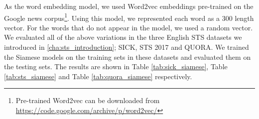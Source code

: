 As the word embedding model, we used Word2vec embeddings \autocite{DBLP:journals/corr/abs-1301-3781} pre-trained on the Google news corpus\footnote{Pre-trained Word2vec can be downloaded from \url{https://code.google.com/archive/p/word2vec/}}. Using this model, we represented each word as a 300 length vector. For the words that do not appear in the model, we used a random vector. 
We evaluated all of the above variations in the three English STS datasets we introduced in \ref{cha:sts_introduction}; SICK, STS 2017 and QUORA. We trained the Siamese models on the training sets in these datasets and evaluated them on the testing sets. The results are shown in Table \ref{tab:sick_siamese}, Table \ref{tab:sts_siamese} and Table \ref{tab:quora_siamese} respectively.


\begin{table}[htb]
	\centering
	\caption[Results for SICK with Siamese Neural Network]{Results for SICK dataset with different variants of Siamese Neural Network. For each variant, Pearson Correlation ($\bm{\rho}$) and Spearman Correlation ($\bm{\tau}$) are reported between the predicted values and the gold labels of the test set. The best result from all the variations is marked with ${\dagger}$.}  
	\label{tab:sick_siamese}
\end{table}


